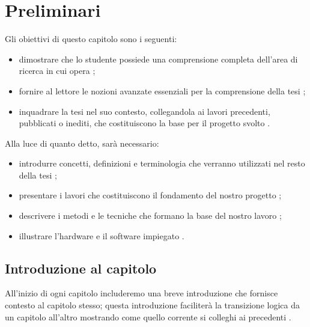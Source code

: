 \chapter{Preliminari}
\label{chap:preliminari}

\acresetall

Gli obiettivi di questo capitolo sono i seguenti:
\begin{itemize}
\item dimostrare che lo studente possiede una comprensione completa dell'area di ricerca in cui opera \cite{pfandzelter2022thesis};
\item fornire al lettore le nozioni avanzate\footnotemark{} essenziali per la comprensione della tesi \cite{zobel2015writing};
\item inquadrare la tesi nel suo contesto, collegandola ai lavori precedenti, pubblicati o inediti, che costituiscono la base per il progetto svolto \cite{unibz2022thesis}.
\end{itemize}


Alla luce di quanto detto, sarà necessario:
\begin{itemize}
\item introdurre concetti, definizioni e terminologia che verranno utilizzati nel resto della tesi \cite{pfandzelter2022thesis};
\item presentare i lavori che costituiscono il fondamento del nostro progetto \cite{unibz2022thesis};
\item descrivere i metodi e le tecniche che formano la base del nostro lavoro \cite{fau2023thesis};
\item illustrare l'hardware e il software impiegato \cite{fau2023thesis}.
\end{itemize}

\section{Introduzione al capitolo}

All'inizio di ogni capitolo includeremo una breve introduzione che fornisce contesto al capitolo stesso; questa introduzione faciliterà la transizione logica da un capitolo all'altro mostrando come quello corrente si colleghi ai precedenti \cite{zobel2015writing}.

